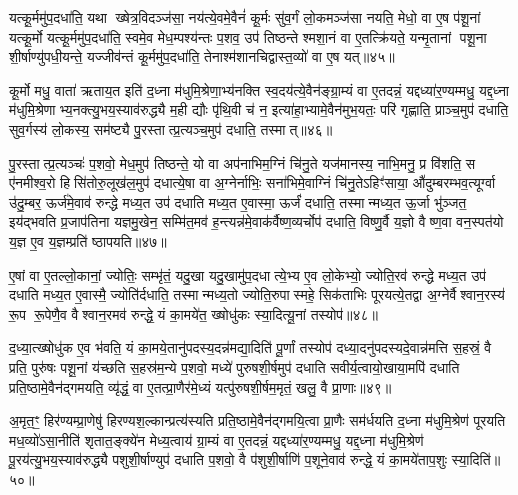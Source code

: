 यत्कू॒र्ममु॑प॒दधा॑ति॒ यथा ख्षेत्र॒विदञ्ज॑सा॒ नय॑त्ये॒वमे॒वैनं॑ कू॒र्मः सु॑व॒र्गं लो॒कमञ्ज॑सा नयति॒ मेधो॒ वा ए॒ष प॑शू॒नां यत्कू॒र्मो यत्कू॒र्ममु॑प॒दधा॑ति॒ स्वमे॒व मेध॒म्पश्य॑न्तः प॒शव॒ उप॑ तिष्ठन्ते श्मशा॒नं वा ए॒तत्क्रि॑यते॒ यन्मृ॒तानां पशू॒ना शी॒र्\mbox{}षाण्यु॑पधी॒यन्ते॒ यज्जीव॑न्तं कू॒र्ममु॑प॒दधा॑ति॒ तेनाश्म॑शानचिद्वास्त॒व्यो॑ वा ए॒ष यत्॥४५॥

कू॒र्मो मधु॒ वाता॑ ऋताय॒त इति॑ द॒ध्ना म॑धुमि॒श्रेणा॒भ्य॑नक्ति स्व॒दय॑त्ये॒वैन॑ङ्ग्रा॒म्यं वा ए॒तदन्नं॒ यद्दध्या॑र॒ण्यम्मधु॒ यद्द॒ध्ना म॑धुमि॒श्रेणाभ्य॒नक्त्यु॒भय॒स्याव॑रुद्ध्यै म॒ही द्यौः पृ॑थि॒वी च॑ न॒ इत्या॑हा॒भ्यामे॒वैन॑मुभ॒यतः॒ परि॑ गृह्णाति॒ प्राञ्च॒मुप॑ दधाति॒ सुव॒र्गस्य॑ लो॒कस्य॒ सम॑ष्ट्यै पु॒रस्तात्प्र॒त्यञ्च॒मुप॑ दधाति॒ तस्मात्॥४६॥

पु॒रस्तात्प्र॒त्यञ्चः॑ प॒शवो॒ मेध॒मुप॑ तिष्ठन्ते॒ यो वा अप॑नाभिम॒ग्निं चि॑नु॒ते यज॑मानस्य॒ नाभि॒मनु॒ प्र वि॑शति॒ स ए॑नमीश्व॒रो हिसि॑तोरु॒लूख॑ल॒मुप॑ दधात्ये॒षा वा अ॒ग्नेर्नाभिः॒ सना॑भिमे॒वाग्निं चि॑नु॒तेऽहिꣳ॑साया॒ औ॑दुम्बरम्भव॒त्यूर्ग्वा उ॑दु॒म्बर॒ ऊर्ज॑मे॒वाव॑ रुन्द्धे मध्य॒त उप॑ दधाति मध्य॒त ए॒वास्मा॒ ऊर्जं॑ दधाति॒ तस्मान्मध्य॒त ऊ॒र्जा भु॑ञ्जत॒ इय॑द्भवति प्र॒जाप॑तिना यज्ञमु॒खेन॒ सम्मि॑त॒मव॑ ह॒न्त्यन्न॑मे॒वाक॑र्वैष्ण॒व्यर्चोप॑ दधाति॒ विष्णु॒र्वै य॒ज्ञो वैष्ण॒वा वन॒स्पत॑यो य॒ज्ञ ए॒व य॒ज्ञम्प्रति॑ ष्ठापयति॥४७॥

{\anuvakamend[{ए॒ष वै प॒शुर्यम॑सर्पदे॒ष यत्तस्मा॒त्तस्माथ्स॒प्तविꣳ॑शतिश्च॥८॥}]}

ए॒षां वा ए॒तल्लो॒कानां॒ ज्योतिः॒ सम्भृ॑तं॒ यदु॒खा यदु॒खामु॑प॒दधात्ये॒भ्य ए॒व लो॒केभ्यो॒ ज्योति॒रव॑ रुन्द्धे मध्य॒त उप॑ दधाति मध्य॒त ए॒वास्मै॒ ज्योति॑र्दधाति॒ तस्मान्मध्य॒तो ज्योति॒रुपास्महे॒ सिक॑ताभिः पूरयत्ये॒तद्वा अ॒ग्नेर्वैश्वान॒रस्य॑ रू॒प रू॒पेणै॒व वैश्वान॒रमव॑ रुन्द्धे॒ यं का॒मये॑त॒ ख्षोधु॑कः स्या॒दित्यू॒नां तस्योप॑॥४८॥

द॒ध्या॒त्ख्षोधु॑क ए॒व भ॑वति॒ यं का॒मये॒तानु॑पदस्य॒दन्न॑मद्या॒दिति॑ पू॒र्णां तस्योप॑ दध्या॒दनु॑पदस्यदे॒वान्न॑मत्ति स॒हस्रं॒ वै प्रति॒ पुरु॑षः पशू॒नां य॑च्छति स॒हस्र॑म॒न्ये प॒शवो॒ मध्ये॑ पुरुषशी॒र्\mbox{}षमुप॑ दधाति सवीर्य॒त्वायो॒खाया॒मपि॑ दधाति प्रति॒ष्ठामे॒वैन॑द्गमयति॒ व्यृ॑द्धं॒ वा ए॒तत्प्रा॒णैर॑मे॒ध्यं यत्पु॑रुषशी॒र्\mbox{}षम॒मृतं॒ खलु॒ वै प्रा॒णाः॥४९॥

अ॒मृत॒ꣳ॒ हिर॑ण्यम्प्रा॒णेषु॑ हिरण्यश॒ल्कान्प्रत्य॑स्यति प्रति॒ष्ठामे॒वैन॑द्गमयि॒त्वा प्रा॒णैः सम॑र्धयति द॒ध्ना म॑धुमि॒श्रेण॑ पूरयति मध॒व्यो॑ऽसा॒नीति॑ शृतात॒ङ्क्ये॑न मेध्य॒त्वाय॑ ग्रा॒म्यं वा ए॒तदन्नं॒ यद्दध्या॑र॒ण्यम्मधु॒ यद्द॒ध्ना म॑धुमि॒श्रेण॑ पू॒रय॑त्यु॒भय॒स्याव॑रुद्ध्यै पशुशी॒र्\mbox{}षाण्युप॑ दधाति प॒शवो॒ वै प॑शुशी॒र्\mbox{}षाणि॑ प॒शूने॒वाव॑ रुन्द्धे॒ यं का॒मये॑ताप॒शुः स्या॒दिति॑॥५०॥

